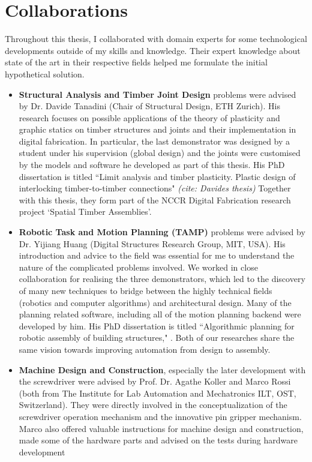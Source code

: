 \section{Collaborations}
\label{section:methodology_collaborations}

Throughout this thesis, I collaborated with domain experts for some technological developments outside of my skills and knowledge. Their expert knowledge about state of the art in their respective fields helped me formulate the initial hypothetical solution. 

\begin{itemize}
	\item \textbf{Structural Analysis and Timber Joint Design }problems were advised by Dr. Davide Tanadini (Chair of Structural Design, ETH Zurich). His research focuses on possible applications of the theory of plasticity and graphic statics on timber structures and joints and their implementation in digital fabrication. In particular, the last demonstrator was designed by a student under his supervision (global design) and the joints were customised by the models and software he developed as part of this thesis. His PhD dissertation is titled ``Limit analysis and timber plasticity. Plastic design of interlocking timber-to-timber connections" \textit{(cite: Davides thesis) }Together with this thesis, they form part of the NCCR Digital Fabrication research project ‘Spatial Timber Assemblies’.

	\item \textbf{Robotic Task and Motion Planning (TAMP) }problems were advised by Dr. Yijiang Huang (Digital Structures Research Group, MIT, USA). His introduction and advice to the field was essential for me to understand the nature of the complicated problems involved. We worked in close collaboration for realising the three demonstrators, which led to the discovery of many new techniques to bridge between the highly technical fields (robotics and computer algorithms) and architectural design. Many of the planning related software, including all of the motion planning backend were developed by him. His PhD dissertation is titled ``Algorithmic planning for robotic assembly of building structures," \parencite{huangAlgorithmicPlanningRobotic2022}. Both of our researches share the same vision towards improving automation from design to assembly. 

	\item \textbf{Machine Design and Construction}, especially the later development with the screwdriver were advised by Prof. Dr. Agathe Koller and Marco Rossi (both from The Institute for Lab Automation and Mechatronics ILT, OST, Switzerland). They were directly involved in the conceptualization of the screwdriver operation mechanism and the innovative pin gripper mechanism. Marco also offered valuable instructions for machine design and construction, made some of the hardware parts and advised on the tests during hardware development

\end{itemize}

